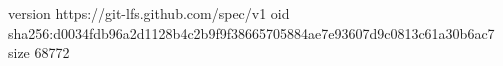 version https://git-lfs.github.com/spec/v1
oid sha256:d0034fdb96a2d1128b4c2b9f9f38665705884ae7e93607d9c0813c61a30b6ac7
size 68772
